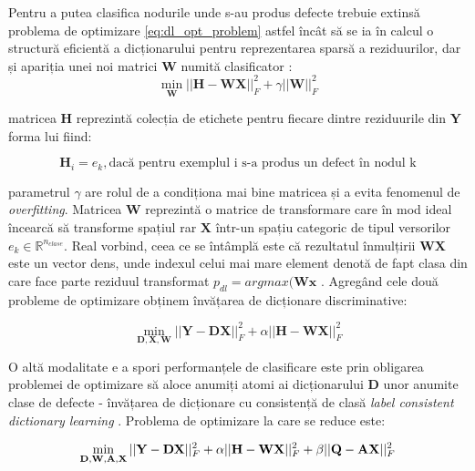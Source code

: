 Pentru a putea clasifica nodurile unde s-au produs defecte trebuie extinsă problema de optimizare \eqref{eq:dl_opt_problem} astfel încât să se ia în calcul o structură eficientă a dicționarului pentru reprezentarea sparsă a reziduurilor, dar și apariția unei noi matrici $\mathbf{W}$ numită clasificator \cite{DL_book}:
\begin{equation}
    \min_{\mathbf{W}} || \mathbf{H} - \mathbf{W}\mathbf{X}||_F^{2} + \gamma ||\mathbf{W}||^2_F
    \label{eq:dl_nmf}
\end{equation}

matricea $\mathbf{H}$ reprezintă colecția de etichete pentru fiecare dintre reziduurile din $\mathbf{Y}$
forma lui fiind:

\begin{equation}
    \mathbf{H}_i = e_k, \text{dacă pentru exemplul i s-a produs un defect în nodul k}
    \label{eq:struct_H}
\end{equation}

parametrul $\gamma$ are rolul de a condiționa mai bine matricea și a evita fenomenul de \textit{overfitting}.
Matricea $\mathbf{W}$ reprezintă o matrice de transformare care în mod ideal încearcă să transforme spațiul rar $\mathbf{X}$ într-un spațiu categoric de tipul versorilor $e_k \in \mathbb{R}^{n_{clase}}$. Real vorbind, ceea ce se întâmplă este că rezultatul înmulțirii $\mathbf{W}\mathbf{X}$ este un vector dens, unde indexul celui mai mare element denotă de fapt clasa din care face parte reziduul transformat $p_{dl} = argmax(\mathbf{W}\mathbf{x}$ \cite[Capitolul 8]{DL_book}. 
Agregând cele două probleme de optimizare obținem învățarea de dicționare discriminative:

\begin{equation}
    \min_{\mathbf{D}, \mathbf{X}, \mathbf{W}} || \mathbf{Y} - \mathbf{D} \mathbf{X} ||^2_F + \alpha || \mathbf{H} - \mathbf{W} \mathbf{X} ||^2_F
    \label{eq:disc_DL}
\end{equation}


O altă modalitate e a spori performanțele de clasificare este prin obligarea problemei de optimizare să aloce anumiți atomi ai dicționarului $\mathbf{D}$ unor anumite clase de defecte - învățarea de dicționare cu consistență de clasă \textit{label consistent dictionary learning} \cite{DL_book}. Problema de optimizare la care se reduce este:

\begin{equation}
    \min_{\mathbf{D}, \mathbf{W}, \mathbf{A}, \mathbf{X}} || \mathbf{Y} - \mathbf{D}\mathbf{X}||^2_F + \alpha ||\mathbf{H} - \mathbf{W} \mathbf{X} ||^2_F + \beta ||\mathbf{Q} - \mathbf{A}\mathbf{X} ||^2_F
\end{equation}

